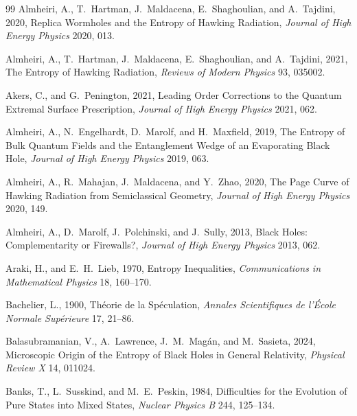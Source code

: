\documentclass[11pt,letterpaper]{article}
\theoremstyle{plain}
\theoremstyle{definition}
\theoremstyle{remark}
\begin{document}
\begin{thebibliography}{99}
Almheiri, A., T.~Hartman, J.~Maldacena, E.~Shaghoulian, and A.~Tajdini, 2020, Replica Wormholes and the Entropy of Hawking Radiation, \textit{Journal of High Energy Physics} 2020, 013.

Almheiri, A., T.~Hartman, J.~Maldacena, E.~Shaghoulian, and A.~Tajdini, 2021, The Entropy of Hawking Radiation, \textit{Reviews of Modern Physics} 93, 035002.

Akers, C., and G.~Penington, 2021, Leading Order Corrections to the Quantum Extremal Surface Prescription, \textit{Journal of High Energy Physics} 2021, 062.

Almheiri, A., N.~Engelhardt, D.~Marolf, and H.~Maxfield, 2019, The Entropy of Bulk Quantum Fields and the Entanglement Wedge of an Evaporating Black Hole, \textit{Journal of High Energy Physics} 2019, 063.

Almheiri, A., R.~Mahajan, J.~Maldacena, and Y.~Zhao, 2020, The Page Curve of Hawking Radiation from Semiclassical Geometry, \textit{Journal of High Energy Physics} 2020, 149.

Almheiri, A., D.~Marolf, J.~Polchinski, and J.~Sully, 2013, Black Holes: Complementarity or Firewalls?, \textit{Journal of High Energy Physics} 2013, 062.

Araki, H., and E.~H.~Lieb, 1970, Entropy Inequalities, \textit{Communications in Mathematical Physics} 18, 160--170.

Bachelier, L., 1900, Th\'{e}orie de la Sp\'{e}culation, \textit{Annales Scientifiques de l'\'{E}cole Normale Sup\'{e}rieure} 17, 21--86.

Balasubramanian, V., A.~Lawrence, J.~M.~Mag\'{a}n, and M.~Sasieta, 2024, Microscopic Origin of the Entropy of Black Holes in General Relativity, \textit{Physical Review X} 14, 011024.

Banks, T., L.~Susskind, and M.~E.~Peskin, 1984, Difficulties for the Evolution of Pure States into Mixed States, \textit{Nuclear Physics B} 244, 125--134.


\end{thebibliography}
\end{document}
